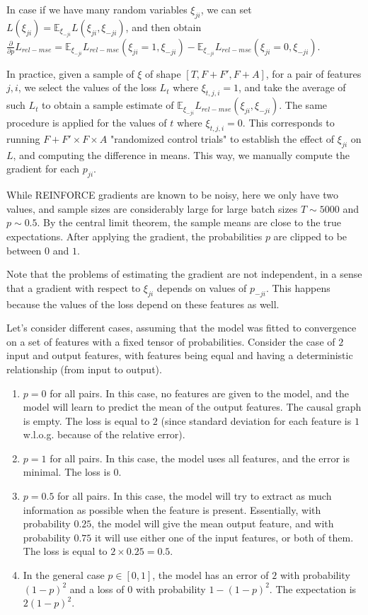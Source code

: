 \documentclass[a4paper,11pt,oneside]{report}
\begin{document}
In case if we have many random variables $\xi_{ji}$, we can set $L(\xi_{ji})=\mathbb E_{\xi_{-ji}}L(\xi_{ji}, \xi_{-ji})$, and then obtain $\frac{\partial }{\partial p}L_{rel-mse}=\mathbb E_{\xi_{-ji}}L_{rel-mse}(\xi_{ji}=1, \xi_{-ji})-\mathbb E_{\xi_{-ji}}L_{rel-mse}(\xi_{ji}=0, \xi_{-ji})$.

In practice, given a sample of $\xi$ of shape $[T, F+F', F+A]$, for a pair of features $j, i$, we select the values of the loss $L_{t}$ where $\xi_{t, j, i}=1$, and take the average of such $L_t$ to obtain a sample estimate of $\mathbb E_{\xi_{-ji}}L_{rel-mse}(\xi_{ji}, \xi_{-ji})$. The same procedure is applied for the values of $t$ where $\xi_{t, j, i}=0$. This corresponds to running $F+F'\times F\times A$ "randomized control trials" to establish the effect of $\xi_{ji}$ on $L$, and computing the difference in means. This way, we manually compute the gradient for each $p_{ji}$.

While REINFORCE gradients are known to be noisy, here we only have two values, and sample sizes are considerably large for large batch sizes $T\sim 5000$ and $p\sim 0.5$. By the central limit theorem, the sample means are close to the true expectations. After applying the gradient, the probabilities $p$ are clipped to be between $0$ and $1$.

Note that the problems of estimating the gradient are not independent, in a sense that a gradient with respect to $\xi_{ji}$ depends on values of $p_{-ji}$. This happens because the values of the loss depend on these features as well.

Let's consider different cases, assuming that the model was fitted to convergence on a set of features with a fixed tensor of probabilities. Consider the case of $2$ input and output features, with features being equal and having a deterministic relationship (from input to output).
\begin{enumerate}
    \item $p=0$ for all pairs. In this case, no features are given to the model, and the model will learn to predict the mean of the output features. The causal graph is empty. The loss is equal to $2$ (since standard deviation for each feature is $1$ w.l.o.g. because of the relative error).
    \item $p=1$ for all pairs. In this case, the model uses all features, and the error is minimal. The loss is $0$.
    \item $p=0.5$ for all pairs. In this case, the model will try to extract as much information as possible when the feature is present. Essentially, with probability $0.25$, the model will give the mean output feature, and with probability $0.75$ it will use either one of the input features, or both of them. The loss is equal to $2\times 0.25=0.5$.
    \item In the general case $p\in [0, 1]$, the model has an error of $2$ with probability $(1-p)^2$ and a loss of $0$ with probability $1-(1-p)^2$. The expectation is $2(1-p)^2$.
\end{enumerate}
\end{document}
